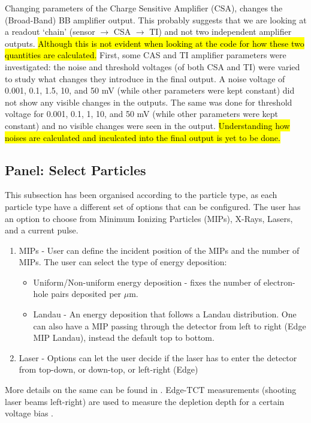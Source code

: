 \documentclass[11pt]{article}
\newcommand{\hlyellow}[1]{{\sethlcolor{yellow}\hl{#1}}}
\begin{document}
Changing parameters of the Charge Sensitive Amplifier (CSA), changes the (Broad-Band) BB amplifier output. This probably suggests that we are looking at a readout `chain' (sensor $\rightarrow$ CSA $\rightarrow$ TI) and not two independent amplifier outputs. \hlyellow{Although this is not evident when looking at the code for how these two quantities are calculated.}
\newline
First, some CAS and TI amplifier parameters were investigated: the noise and threshold voltages (of both CSA and TI) were varied to study what changes they introduce in the final output. A noise voltage of 0.001, 0.1, 1.5, 10, and 50 mV (while other parameters were kept constant) did not show any visible changes in the outputs. The same was done for threshold voltage for 0.001, 0.1, 1, 10, and 50 mV (while other parameters were kept constant) and no visible changes were seen in the output. \hlyellow{Understanding how noises are calculated and inculcated into the final output is yet to be done.}

\subsection{Panel: Select Particles}\label{sec:select-particles}
This subsection has been organised according to the particle type, as each particle type have a different set of options that can be configured. The user has an option to choose from Minimum Ionizing Particles (MIPs), X-Rays, Lasers, and a current pulse.
\begin{enumerate}
    \item MIPs - User can define the incident position of the MIPs and the number of MIPs. The user can select the type of energy deposition:
    \begin{itemize}
        \item Uniform/Non-uniform energy deposition - fixes the number of electron-hole pairs deposited per $\mu$m.
        \item Landau - An energy deposition that follows a Landau distribution. One can also have a MIP passing through the detector from left to right (Edge MIP Landau), instead the default top to bottom.
    \end{itemize}
    \item Laser - Options can let the user decide if the laser has to enter the detector from top-down, or down-top, or left-right (Edge)
\end{enumerate}
More details on the same can be found in \cite{WF2-incident-particles-cenna}.
\newline
Edge-TCT measurements (shooting laser beams left-right) are used to measure the depletion depth for a certain voltage bias \cite{moll-acceptor-removal}.
\end{document}
